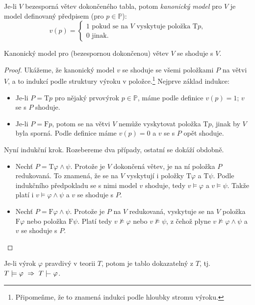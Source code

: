 \begin{definition}\label{definition:canonical-model}
Je-li $V$ bezesporná větev dokončeného tabla, potom \emph{kanonický model} pro $V$ je model definovaný předpisem (pro $p\in\mathbb P$):
$$
v(p)=\begin{cases}
    1 \text{ pokud se na $V$ vyskytuje položka $\mathrm{T}p$,}\\
    0 \text{ jinak.}
\end{cases}
$$
\end{definition}
\begin{lemma}\label{lemma:canonical-model-agrees}
    Kanonický model pro (bezespornou dokončenou) větev $V$ se shoduje s $V$.
\end{lemma}
\begin{proof}
Ukážeme, že kanonický model $v$ se shoduje se všemi položkami $P$ na větvi $V$, a to indukcí podle struktury výroku v položce.\footnote{Připomeňme, že to znamená indukci podle hloubky stromu výroku.} Nejprve základ indukce:
\begin{itemize}
    \item Je-li $P=\mathrm{T}p$ pro nějaký prvovýrok $p\in\mathbb P$, máme podle definice $v(p)=1$; $v$ se s $P$ shoduje.
    \item Je-li $P=\mathrm{F}p$, potom se na větvi $V$ nemůže vyskytovat položka $\mathrm{T}p$, jinak by $V$ byla sporná. Podle definice máme $v(p)=0$ a $v$ se s $P$ opět shoduje.
\end{itemize}
Nyní indukční krok. Rozebereme dva případy, ostatní se dokáží obdobně.
\begin{itemize}
    \item Nechť $P=\mathrm{T}\varphi\land\psi$. Protože je $V$ dokončená větev, je na ní položka $P$ redukovaná. To znamená, že se na $V$ vyskytují i položky $\mathrm{T}\varphi$ a $\mathrm{T}\psi$. Podle indukčního předpokladu se s nimi model $v$ shoduje, tedy $v\models\varphi$ a $v\models\psi$. Takže platí i $v\models\varphi\land\psi$ a $v$ se shoduje s $P$.
    \item Nechť $P=\mathrm{F}\varphi\land\psi$. Protože je $P$ na $V$ redukovaná, vyskytuje se na $V$ položka $\mathrm{F}\varphi$ nebo položka $\mathrm{F}\psi$. Platí tedy $v\not\models\varphi$ nebo $v\not\models\psi$, z čehož plyne $v\not\models\varphi\land\psi$ a $v$ se shoduje s $P$.
\end{itemize}
\end{proof}

\begin{theorem}[O úplnosti]
    Je-li výrok $\varphi$ pravdivý v teorii $T$, potom je tablo dokazatelný z $T$, tj. $T\models\varphi\ \Rightarrow\ T\proves\varphi$.
\end{theorem}

